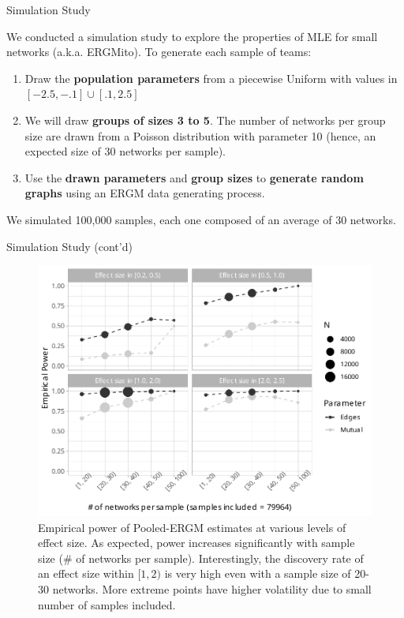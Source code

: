 \documentclass[10pt,ignorenonframetext,aspectratio=169,]{beamer}
\begin{document}
\begin{frame}{Simulation Study}
\protect\hypertarget{simulation-study}{}

We conducted a simulation study to explore the properties of MLE for
small networks (a.k.a. ERGMito). To generate each sample of teams:\pause

\begin{enumerate}
\item
  Draw the \textbf{population parameters} from a piecewise Uniform with
  values in \([-2.5, -.1]\cup[.1, 2.5]\)\pause
\item
  We will draw \textbf{groups of sizes 3 to 5}. The number of networks
  per group size are drawn from a Poisson distribution with parameter 10
  (hence, an expected size of 30 networks per sample).\pause
\item
  Use the \textbf{drawn parameters} and \textbf{group sizes} to
  \textbf{generate random graphs} using an ERGM data generating
  process.\pause
\end{enumerate}

We simulated 100,000 samples, each one composed of an average of 30
networks.

\end{frame}

\begin{frame}{Simulation Study (cont'd)}
\protect\hypertarget{simulation-study-contd}{}

\begin{figure}
\centering
\includegraphics[width=.55\linewidth]{fig/power-02-various-sizes-3-5.pdf}
\caption{Empirical power of Pooled-ERGM estimates at various levels of effect size. As expected, power increases significantly with sample size (\# of networks per sample). Interestingly, the discovery rate of an effect size within $[1, 2)$ is very high even with a sample size of 20-30 networks. More extreme points have higher volatility due to small number of samples included.}
\end{figure}

\end{frame}
\end{document}
